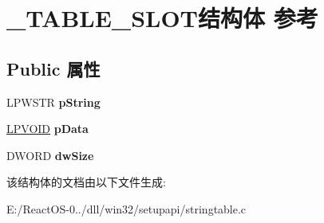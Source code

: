 \hypertarget{struct___t_a_b_l_e___s_l_o_t}{}\section{\+\_\+\+T\+A\+B\+L\+E\+\_\+\+S\+L\+O\+T结构体 参考}
\label{struct___t_a_b_l_e___s_l_o_t}
\subsection*{Public 属性}
\begin{DoxyCompactItemize}
\item 
\mbox{\label{struct___t_a_b_l_e___s_l_o_t_a8229bf76484efc9a91439aba9844a9f7}} 
L\+P\+W\+S\+TR {\bfseries p\+String}
\item 
\mbox{\label{struct___t_a_b_l_e___s_l_o_t_afdca03c61a10cffe68d85412df1b200e}} 
\hyperlink{interfacevoid}{L\+P\+V\+O\+ID} {\bfseries p\+Data}
\item 
\mbox{\label{struct___t_a_b_l_e___s_l_o_t_afa693656291a56c008b393eba05c8e24}} 
D\+W\+O\+RD {\bfseries dw\+Size}
\end{DoxyCompactItemize}


该结构体的文档由以下文件生成\+:\begin{DoxyCompactItemize}
\item 
E\+:/\+React\+O\+S-\/0../dll/win32/setupapi/stringtable.\+c\end{DoxyCompactItemize}
